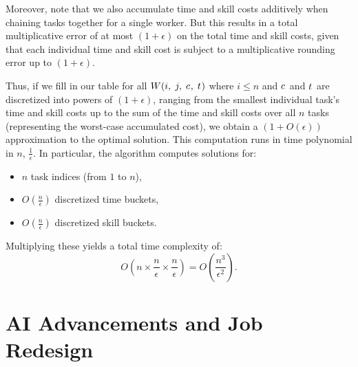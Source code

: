 \documentclass{article}
\theoremstyle{plain}
\theoremstyle{plain}
\begin{document}
Moreover, note that we also accumulate time and skill costs additively when chaining tasks together for a single worker.  
But this results in a total multiplicative error of at most $(1+\epsilon)$ on the total time and skill costs, given that each individual time and skill cost is subject to a multiplicative rounding error up to $(1+\epsilon)$.

Thus, if we fill in our table for all $W(i,\; j,\; c_{},\; t_{})$ where $i \leq n$ and $c_{}$ and $t_{}$ are discretized into powers of $(1+\epsilon)$, ranging from the smallest individual task's time and skill costs up to the sum of the time and skill costs over all $n$ tasks (representing the worst-case accumulated cost), we obtain a $(1 + O(\epsilon))$ approximation to the optimal solution.
This computation runs in time polynomial in $n$, $\frac{1}{\epsilon}$. %
In particular, the algorithm computes solutions for:
\begin{itemize}
\item $n$ task indices (from $1$ to $n$),
\item $O(\frac{n}{\epsilon})$ discretized time buckets,
\item $O(\frac{n}{\epsilon})$ discretized skill buckets.
\end{itemize}
Multiplying these yields a total time complexity of:
\[
O\left(n \times \frac{n}{\epsilon} \times \frac{n}{\epsilon}\right) = O\left(\frac{n^3}{\epsilon^2}\right).
\]





\section{AI Advancements and Job Redesign}
\label{sec:job_redesign}
\end{document}
